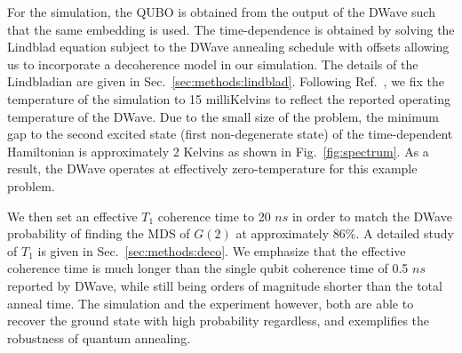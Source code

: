 \documentclass[prd,twocolumn,tightenlines,preprintnumbers,showpacs,superscriptaddress,notitlepage,nofootinbib,eqsecnum,floatfix,longbibliography]{revtex4}
\begin{document}
For the simulation, the QUBO is obtained from the output of the DWave such that the same embedding is used.
The time-dependence is obtained by solving the Lindblad equation subject to the DWave annealing schedule with offsets allowing us to incorporate a decoherence model in our simulation.
The details of the Lindbladian are given in Sec.~\ref{sec:methods:lindblad}.
Following Ref.~\cite{}, we fix the temperature of the simulation to 15 milliKelvins to reflect the reported operating temperature of the DWave.
Due to the small size of the problem, the minimum gap to the second excited state (first non-degenerate state) of the time-dependent Hamiltonian is approximately 2 Kelvins as shown in Fig.~\ref{fig:spectrum}.
As a result, the DWave operates at effectively zero-temperature for this example problem.

We then set an effective $T_1$ coherence time to 20 $ns$ in order to match the DWave probability of finding the MDS of $G(2)$ at approximately 86\%.
A detailed study of $T_1$ is given in Sec.~\ref{sec:methods:deco}.
We emphasize that the effective coherence time is much longer than the single qubit coherence time of 0.5 $ns$ reported by DWave, while still being orders of magnitude shorter than the total anneal time.
The simulation and the experiment however, both are able to recover the ground state with high probability regardless, and exemplifies the robustness of quantum annealing.
\end{document}
